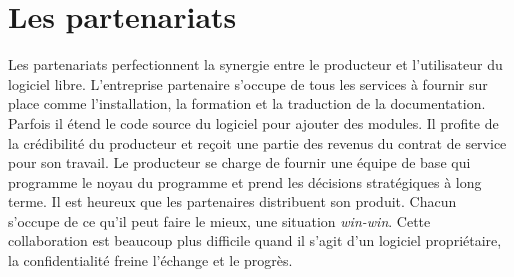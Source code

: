 \section*{Les partenariats}
Les partenariats perfectionnent la synergie entre le producteur et l'utilisateur du logiciel
libre. L'entreprise partenaire s'occupe de tous les services à fournir sur place comme l'installation, la formation et
la traduction de la documentation. Parfois il étend le code source du logiciel pour ajouter des modules. 
Il profite de la crédibilité du producteur et reçoit une partie des revenus du contrat de service pour son travail.
Le producteur se charge de fournir une équipe de base qui programme le noyau du programme et 
prend les décisions stratégiques à long terme. Il est heureux que les partenaires
distribuent son produit. Chacun s'occupe de ce qu'il peut faire le mieux, une situation \textit{win-win}.
Cette collaboration est beaucoup plus difficile
quand il s'agit d'un logiciel propriétaire, la confidentialité freine l'échange et le progrès.

	

